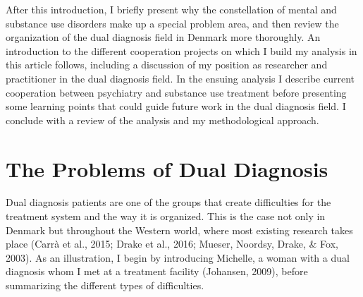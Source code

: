 \begin{multicols}{2}
\par
After this introduction, I briefly present why the constellation of mental and substance use disorders make up a special problem area, and then review the organization of the dual diagnosis field in Denmark more thoroughly. An introduction to the different cooperation projects on which I build my analysis in this article follows, including a discussion of my position as researcher and practitioner in the dual diagnosis field. In the ensuing analysis I describe current cooperation between psychiatry and substance use treatment before presenting some learning points that could guide future work in the dual diagnosis field. I conclude with a review of the analysis and my methodological approach. 

\chapter{The Problems of Dual Diagnosis}
Dual diagnosis patients are one of the groups that create difficulties for the treatment system and the way it is organized. This is the case not only in Denmark but throughout the Western world, where most existing research takes place (Carrà et al., 2015; Drake et al., 2016; Mueser, Noordsy, Drake, \& Fox, 2003). As an illustration, I begin by introducing Michelle, a woman with a dual diagnosis whom I met at a treatment facility (Johansen, 2009), before summarizing the different types of difficulties.
\par

\end{multicols}
